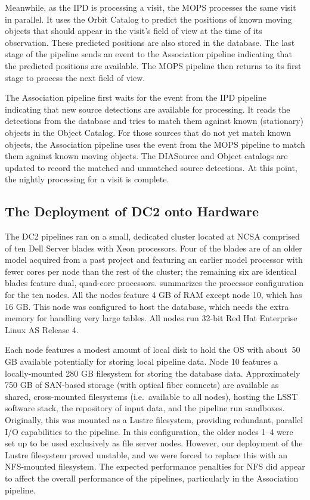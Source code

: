 Meanwhile, as the IPD is processing a visit, the MOPS processes the
same visit in parallel.  It uses the Orbit Catalog to predict the
positions of known moving objects that should appear in the visit's
field of view at the time of its observation.  These predicted
positions are also stored in the database.  The last stage of the
pipeline sends an event to the Association pipeline indicating that
the predicted positions are available.  The MOPS pipeline then returns
to its first stage to process the next field of view.   

The Association pipeline first waits for the event from the IPD
pipeline indicating that new source detections are available for
processing.  It reads the detections from the database and tries to
match them against known (stationary) objects in the Object Catalog.
For those sources that do not yet match known objects, the Association
pipeline uses the event from the MOPS pipeline to match them against
known moving objects.  The DIASource and Object catalogs are updated
to record the matched and unmatched source detections.  At this point, 
the nightly processing for a visit is complete.  

\subsection{The Deployment of DC2 onto Hardware}\label{sComp-hw}

The DC2 pipelines ran on a small, dedicated cluster located at NCSA
comprised of ten Dell Server blades with Xeon processors.  Four of the
blades are of an older model acquired from a past project and
featuring an earlier model processor with fewer cores per node than
the rest of the cluster; the remaining six are identical blades
feature dual, quad-core processors.   summarizes
the processor configuration for the ten nodes.  All the nodes feature
4 GB of RAM except node 10, which has 16 GB.  This node was configured
to host the database, which needs the extra memory for handling very
large tables.  All nodes run 32-bit Red Hat Enterprise Linux AS
Release 4. 

Each node features a modest amount of local disk to hold the OS with
about $~50$ GB available potentially for storing local pipeline data.
Node 10 features a locally-mounted 280 GB filesystem for storing the
database data.  Approximately 750 GB of SAN-based storage (with
optical fiber connects) are available as shared, cross-mounted
filesystems (i.e.~available to all nodes), hosting the LSST software
stack, the repository of input data, and the pipeline run sandboxes.
Originally, this was mounted as a Lustre filesystem, providing
redundant, parallel I/O capabilities to the pipeline.  In this
configuration, the older nodes 1--4 were set up to be used exclusively
as file server nodes.  However, our deployment of the Lustre
filesystem proved unstable, and we were forced to replace this with an
NFS-mounted filesystem.  The expected performance penalties for
NFS did appear
to affect the overall performance of the pipelines, particularly in 
the Association pipeline.

